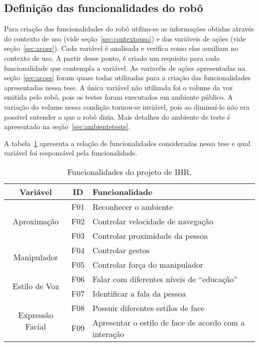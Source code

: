 \subsection{Definição das funcionalidades do robô}
\label{sec:funcionalidades}
Para criação das funcionalidades do robô utiliza-se as informações obtidas através do contexto de uso (vide seção~\ref{sec:contextouso}) e das variáveis de ações (vide seção~\ref{sec:acoes}). Cada variável é analisada e verifica como elas auxiliam no contexto de uso. A partir desse ponto, é criado um requisito para cada funcionalidade que contempla a variável. As variavéis de ações apresentadas na seção~\ref{sec:acoes} foram quase todas utilizadas para a criação das funcionalidades apresentadas nessa tese. A única variável não utilizada foi o volume da voz emitida pelo robô, pois os testes foram executados em ambiente público. A variação do volume nessa condição tornou-se inviável, pois ao diminuí-lo não era possível entender o que o robô dizia. Mais detalhes do ambiente de teste é apresentado na seção~\ref{sec:ambienteteste}.

A tabela~\ref{tab:funcionalidades} apresenta a relação de funcionalidades consideradas nessa tese e qual variável foi responsável pela funcionalidade.

\begin{table}[!ht]
	\caption{Funcionalidades do projeto de IHR.}
	\label{tab:funcionalidades}
	\centering
	\begin{tabular}{c | c | l}
        \hline
        Variável & ID & Funcionalidade \\
        \hline
		\multirow{3}{*}{Aproximação} & F01 & Reconhecer o ambiente \\
        \hhline{~--}
        & F02 & Controlar velocidade de navegação \\
        \hhline{~--}
        & F03 & Controlar proximidade da pessoa \\
        \hline
		\multirow{2}{*}{Manipulador} & F04 & Controlar gestos \\
        \hhline{~--}
        & F05 & Controlar força do manipulador \\
        \hline
		\multirow{2}{*}{Estilo de Voz} & F06 & Falar com diferentes níveis de ``educação'' \\
        \hhline{~--}
        & F07 & Identificar a fala da pessoa \\
        \hline
		\multirow{2}{*}{Expressão Facial} & F08 & Possuir diferentes estilos de face \\
		\hhline{~--}
		& F09 & Apresentar o estilo de face de acordo com a interação \\
		\hline
	\end{tabular}
\end{table}

